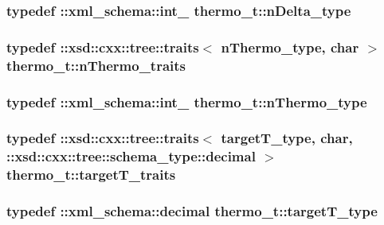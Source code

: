 \hypertarget{classthermo__t_a814f5379ac544ebfdb16162514d961c1}{
\subsubsection[{n\-Delta\-\_\-type}]{\setlength{\rightskip}{0pt plus 5cm}typedef \-::{\bf xml\-\_\-schema\-::int\-\_\-} {\bf thermo\-\_\-t\-::n\-Delta\-\_\-type}}}\label{classthermo__t_a814f5379ac544ebfdb16162514d961c1}
\hypertarget{classthermo__t_a7733c2995c40646e0c3db3863b4a69ce}{
\subsubsection[{n\-Thermo\-\_\-traits}]{\setlength{\rightskip}{0pt plus 5cm}typedef \-::xsd\-::cxx\-::tree\-::traits$<$ {\bf n\-Thermo\-\_\-type}, char $>$ {\bf thermo\-\_\-t\-::n\-Thermo\-\_\-traits}}}\label{classthermo__t_a7733c2995c40646e0c3db3863b4a69ce}
\hypertarget{classthermo__t_a37e4458c88caf30dc0257b65e5f2af94}{
\subsubsection[{n\-Thermo\-\_\-type}]{\setlength{\rightskip}{0pt plus 5cm}typedef \-::{\bf xml\-\_\-schema\-::int\-\_\-} {\bf thermo\-\_\-t\-::n\-Thermo\-\_\-type}}}\label{classthermo__t_a37e4458c88caf30dc0257b65e5f2af94}
\hypertarget{classthermo__t_acf5862bbbc6795105277c01ea3797d48}{
\subsubsection[{target\-T\-\_\-traits}]{\setlength{\rightskip}{0pt plus 5cm}typedef \-::xsd\-::cxx\-::tree\-::traits$<$ {\bf target\-T\-\_\-type}, char, \-::xsd\-::cxx\-::tree\-::schema\-\_\-type\-::decimal $>$ {\bf thermo\-\_\-t\-::target\-T\-\_\-traits}}}\label{classthermo__t_acf5862bbbc6795105277c01ea3797d48}
\hypertarget{classthermo__t_a87b71140ee6bb1936aeed1d3b79a3596}{
\subsubsection[{target\-T\-\_\-type}]{\setlength{\rightskip}{0pt plus 5cm}typedef \-::{\bf xml\-\_\-schema\-::decimal} {\bf thermo\-\_\-t\-::target\-T\-\_\-type}}}\label{classthermo__t_a87b71140ee6bb1936aeed1d3b79a3596}


